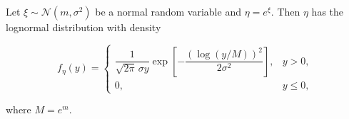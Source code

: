 Let $\xi \sim \mathcal{N}(m, \sigma^2)$ be a normal random variable and $\eta = e^\xi$. Then $\eta$ has the lognormal distribution with density

$$f_\eta(y) = \begin{cases} \dfrac{1}{\sqrt{2\pi}\,\sigma y} \exp\!\left[-\dfrac{(\log(y/M))^2}{2\sigma^2}\right], & y > 0, \\[10pt] 0, & y \leq 0, \end{cases}$$

where $M = e^m$.
